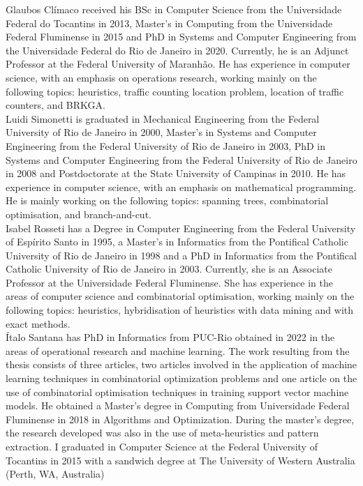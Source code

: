 \documentclass{singlecol-new}
\begin{document}

\begin{bio}

\noindent Glaubos Clímaco received his BSc in Computer Science
from the Universidade Federal do Tocantins in 2013, Master’s in Computing
from the Universidade Federal Fluminense in 2015 and PhD in Systems and
Computer Engineering from the Universidade Federal do Rio de Janeiro in
2020. Currently, he is an Adjunct Professor at the Federal University of
Maranhão. He has experience in computer science, with an emphasis on
operations research, working mainly on the following topics: heuristics, traffic
counting location problem, location of traffic counters, and BRKGA.
\\

Luidi Simonetti is graduated in Mechanical Engineering from the Federal
University of Rio de Janeiro in 2000, Master’s in Systems and Computer
Engineering from the Federal University of Rio de Janeiro in 2003, PhD
in Systems and Computer Engineering from the Federal University of Rio
de Janeiro in 2008 and Postdoctorate at the State University of Campinas
in 2010. He has experience in computer science, with an emphasis on
mathematical programming. He is mainly working on the following topics:
spanning trees, combinatorial optimisation, and branch-and-cut.
\\

Isabel Rosseti has a Degree in Computer Engineering from the Federal
University of Espírito Santo in 1995, a Master’s in Informatics from the
Pontifical Catholic University of Rio de Janeiro in 1998 and a PhD
in Informatics from the Pontifical Catholic University of Rio de Janeiro
in 2003. Currently, she is an Associate Professor at the Universidade
Federal Fluminense. She has experience in the areas of computer science
and combinatorial optimisation, working mainly on the following topics:
heuristics, hybridisation of heuristics with data mining and with exact
methods.
\\

Ítalo Santana has PhD in Informatics from PUC-Rio obtained in 2022 in the areas of operational research and machine learning. The work resulting from the thesis consists of three articles, two articles involved in the application of machine learning techniques in combinatorial optimization problems and one article on the use of combinatorial optimisation techniques in training support vector machine models. He obtained a Master's degree in Computing from Universidade Federal Fluminense in 2018 in Algorithms and Optimization. During the master's degree, the research developed was also in the use of meta-heuristics and pattern extraction. I graduated in Computer Science at the Federal University of Tocantins in 2015 with a sandwich degree at The University of Western Australia (Perth, WA, Australia)

    
\end{bio}
\end{document}

